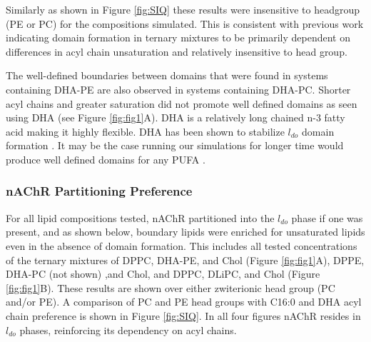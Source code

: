 	Similarly as shown in Figure \ref{fig:SIQ} %
	these results were insensitive to headgroup (PE or PC) for the compositions simulated.  %
	This is consistent with previous work \cite{Inglfsson_Lipid_2014,Risselada_The_2008,Perlmutter_Interleaflet_2011,Veatch_Organization_2002} indicating domain formation in ternary mixtures to be primarily dependent on differences in acyl chain unsaturation and relatively insensitive to head group.   %

	The well-defined boundaries between domains that were found in systems containing DHA-PE are also observed in systems containing DHA-PC. Shorter acyl chains and greater saturation did not promote well defined domains as seen using DHA (see Figure \ref{fig:fig1}A). DHA is a relatively long chained n-3 fatty acid making it highly flexible. DHA has been shown to stabilize $l_{do}$ domain formation \cite{Levental_Polyunsaturated_2016,Lor2015}.  It may be the case running our simulations for longer time would produce well defined domains for any PUFA \cite{Risselada_The_2008}.

\subsubsection{nAChR Partitioning Preference} \label{PUFA}
	For all lipid compositions tested, nAChR partitioned into the $l_{do}$ phase if one was present, and as shown below, boundary lipids were enriched for unsaturated lipids even in the absence of domain formation.  %
	This includes all tested concentrations of the ternary mixtures of DPPC, DHA-PE, and Chol (Figure \ref{fig:fig1}A), DPPE, DHA-PC (not shown) ,and Chol, and DPPC, DLiPC, and Chol (Figure \ref{fig:fig1}B).%
	These results are shown over either zwiterionic head group (PC and/or PE). A comparison of PC and PE head groups with C16:0 and DHA acyl chain preference is shown in Figure \ref{fig:SIQ}. In all four figures nAChR resides in $l_{do}$ phases, reinforcing its dependency on acyl chains.

